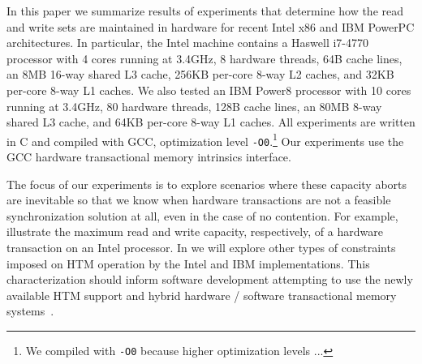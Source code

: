 
In this paper we summarize results of experiments 
that determine how the
read and write sets are maintained in hardware for recent 
Intel x86 and IBM PowerPC architectures. In particular,
the Intel machine contains a Haswell i7-4770 processor with 4
cores running at 3.4GHz, 8 hardware threads, 64B cache lines, an 8MB
16-way shared L3 cache, 256KB per-core 8-way L2 caches, 
and 32KB per-core 8-way L1 caches.
We also tested an IBM Power8 processor with 10 cores running at 3.4GHz,
80 hardware threads, 128B cache lines, an 80MB 8-way
shared L3 cache, and 64KB per-core 8-way L1 caches.
All experiments are written in C and compiled with GCC, 
optimization level
\texttt{-O0}.\footnote{We compiled with \texttt{-O0} because
higher optimization levels ...} Our experiments use the GCC hardware 
transactional memory intrinsics interface.

The focus of our experiments is to explore scenarios where these
capacity aborts are inevitable so that we know 
when hardware transactions are
not a feasible synchronization solution at all, 
even in the case of no contention. For example, 
illustrate the maximum read and write capacity, respectively,
of a hardware transaction on an Intel processor.  In 
we will explore other types of constraints imposed on
HTM operation by the Intel and IBM implementations.
This characterization should inform
software development attempting to use the newly available HTM support 
and hybrid hardware / software transactional memory systems~\cite{???}. 
